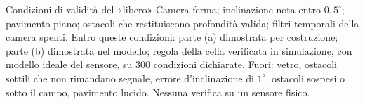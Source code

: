 \begin{riquadro}{Condizioni di validità del «libero»}
Camera ferma; inclinazione nota entro $0{,}5^\circ$; pavimento piano; ostacoli che restituiscono profondità valida; filtri temporali della camera spenti. Entro queste condizioni: parte (a) dimostrata per costruzione; parte (b) dimostrata nel modello; regola della cella verificata in simulazione, con modello ideale del sensore, su 300 condizioni dichiarate. Fuori: vetro, ostacoli sottili che non rimandano segnale, errore d'inclinazione di $1^\circ$, ostacoli sospesi o sotto il campo, pavimento lucido. Nessuna verifica su un sensore fisico.
\end{riquadro}
